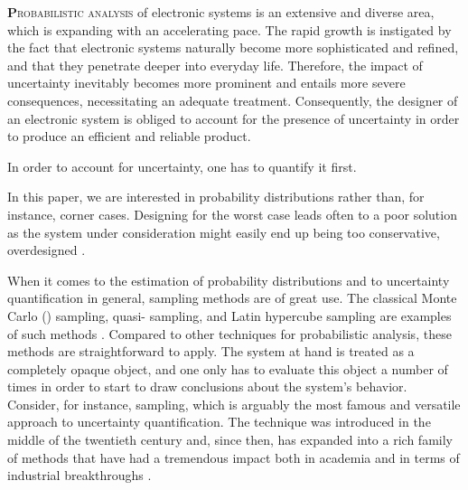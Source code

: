 \lettrine[findent=0.4em, nindent=0em]{\textbf{P}}{robabilistic analysis} of
electronic systems is an extensive and diverse area, which is expanding with an
accelerating pace. The rapid growth is instigated by the fact that electronic
systems naturally become more sophisticated and refined, and that they penetrate
deeper into everyday life. Therefore, the impact of uncertainty inevitably
becomes more prominent and entails more severe consequences, necessitating an
adequate treatment. Consequently, the designer of an electronic system is
obliged to account for the presence of uncertainty in order to produce an
efficient and reliable product.

In order to account for uncertainty, one has to quantify it first. 

 In this paper, we are interested in
probability distributions rather than, for instance, corner cases. Designing for
the worst case leads often to a poor solution as the system under consideration
might easily end up being too conservative, overdesigned \cite{quinton2012}.

When it comes to the estimation of probability distributions and to uncertainty
quantification in general, sampling methods are of great use. The classical
Monte Carlo () sampling, quasi- sampling, and Latin hypercube
sampling are examples of such methods \cite{asmussen2007}. Compared to other
techniques for probabilistic analysis, these methods are straightforward to
apply. The system at hand is treated as a completely opaque object, and one only
has to evaluate this object a number of times in order to start to draw
conclusions about the system's behavior. Consider, for instance, 
sampling, which is arguably the most famous and versatile approach to
uncertainty quantification. The technique was introduced in the middle of the
twentieth century and, since then, has expanded into a rich family of methods
that have had a tremendous impact both in academia and in terms of industrial
breakthroughs \cite{asmussen2007}.

